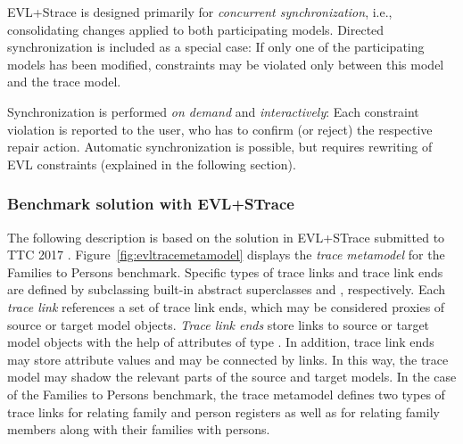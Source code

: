 EVL+Strace is designed primarily for \emph{concurrent synchronization}, i.e., consolidating  changes applied to both participating models.
Directed synchronization is included as a special case: If only one of the participating models has been modified, constraints may be violated only between this model and the trace model.

Synchronization is performed \emph{on demand} and \emph{interactively}: Each constraint violation is reported to the user, who has to confirm (or reject) the respective repair action.
Automatic synchronization is possible, but requires rewriting of EVL constraints (explained in the following section).

\subsubsection{Benchmark solution with EVL+STrace}
\label{sec:solutionEVL}

The following description is based on the solution in EVL+STrace submitted to TTC 2017 \cite{Samimi-Dehkordi2017}.
Figure~\ref{fig:evltracemetamodel} displays the \emph{trace metamodel} for the Families to Persons benchmark. Specific types of trace links and trace link ends are defined by subclassing built-in abstract superclasses  and , respectively. Each \emph{trace link} references a set of trace link ends, which may be considered proxies of source or target model objects. \emph{Trace link ends} store links to source or target model objects with the help of attributes of type . In addition, trace link ends may store attribute values and may be connected by links. In this way, the trace model may shadow the relevant parts of the source and target models. In the case of the Families to Persons benchmark, the trace metamodel defines two types of trace links for relating family and person registers as well as for relating family members along with their families with persons.


 


